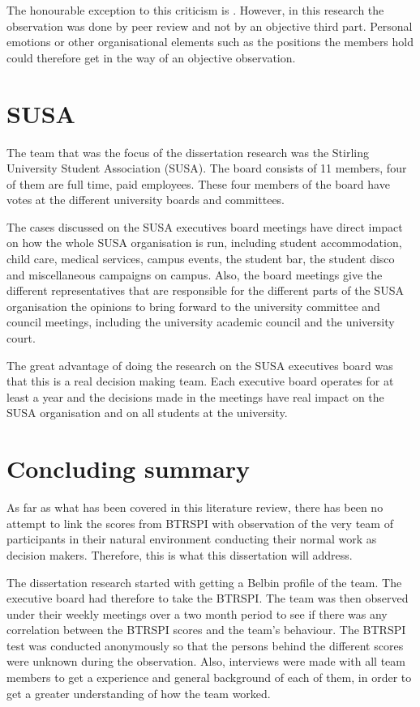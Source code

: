 \documentclass[a4paper,12pt,titlepage]{report}
\begin{document}
  The honourable exception to this criticism is \citet{bsss}. However,
  in this research the observation was done by peer review and not by an
  objective third part. Personal emotions or other organisational
  elements such as the positions the members hold
  could therefore get in the way of an objective observation.

  \section{SUSA}
  The team that was the focus of the dissertation research was the
  Stirling University Student Association (SUSA).
  The board consists of 11 members, four of them
  are full time, paid employees. These four members of the
  board have votes at the different university boards and committees.

  The cases discussed on the SUSA executives board meetings
  have direct impact on how the whole SUSA organisation is run,
  including student accommodation, child care, medical services,
  campus events, the student bar, the student disco and
  miscellaneous campaigns on campus.
  Also, the board meetings give the different representatives that are responsible
  for the different parts of the SUSA organisation the opinions to
  bring forward to the university committee and council meetings, including
  the university academic council and the university court.

  The great advantage of doing the research on the SUSA executives board
  was that this is a real decision making team. Each executive board
  operates for at least a year and the decisions made in the meetings
  have real impact on the SUSA organisation and on all students at the university.

  \section{Concluding summary}

  As far as what has been covered in this literature review,
  there has been no attempt to link the scores from BTRSPI with observation of
  the very team of participants in their natural environment conducting their
  normal work as decision makers. Therefore, this is what this
  dissertation will address.

  The dissertation research started with getting a Belbin profile of the team.
  The executive board had therefore to take the BTRSPI.
  The team was then observed under their weekly meetings over a two month
  period to see if there was any correlation between the BTRSPI scores
  and the team's behaviour. The BTRSPI test was conducted anonymously
  so that the persons behind the different scores were unknown during the
  observation.
  Also, interviews were made with all team members to get a experience and
  general background of each of them, in order to get a greater
  understanding of how the team worked. 
\end{document}
